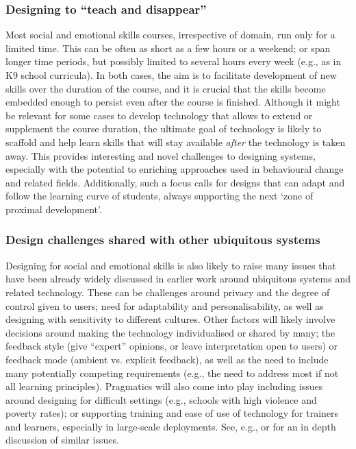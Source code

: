 \documentclass[prodmode,acmtochi]{acmsmall}
\newcommand{\GeraldineTODO}[1]{}
\begin{document}

\subsubsection{Designing to ``teach and disappear''} Most social and emotional skills courses, irrespective of domain, run only for a limited time. This can be often as short as a few hours or a weekend; or span longer time periods, but possibly limited to several hours every week (e.g., as in K9 school curricula). 
In both cases, the aim is to facilitate development of new skills over the duration of the course, and it is crucial that the skills become embedded enough to persist even after the course is finished. 
Although it might be relevant for some cases to develop technology that allows to extend or supplement the course duration, the ultimate goal of technology is likely to scaffold and help learn skills that will stay available \emph{after} the technology is taken away. This provides interesting and novel challenges to designing systems, especially with the potential to enriching approaches used in behavioural change and related fields. Additionally, such a focus calls for designs that can adapt and follow the learning curve of students, always supporting the next `zone of proximal development'. \GeraldineTODO{G: ref vygotsky or similar here} \GeraldineTODO{G: and where people might just pick up the tech again every now and then to check how they are going }


\subsubsection{Design challenges shared with other ubiquitous systems}
        Designing for social and emotional skills is also likely to raise many issues that have been already widely discussed in earlier work around ubiquitous systems and related technology. These can be challenges around privacy and the degree of control given to users; need for adaptability and personalisability, as well as designing with sensitivity to different cultures. Other factors will likely involve decisions around making the technology individualised or shared by many; the feedback style (give ``expert'' opinions, or leave interpretation open to users) or feedback mode (ambient vs. explicit feedback), as well as the need to include many potentially competing requirements (e.g., the need to address most if not all learning principles). Pragmatics will also come into play including issues around designing for difficult settings (e.g., schools with high violence and poverty rates); or supporting training and ease of use of technology for trainers and learners, especially in large-scale deployments.  %
See, e.g.,  or  for an in depth discussion of similar issues.
\end{document}
